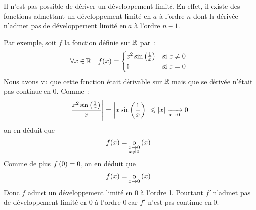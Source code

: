 \documentclass{magnoliaold}
\begin{document}
\begin{remarqueUnique}
\remarque Il n'est pas possible de dériver un développement limité.
  En effet, il existe des fonctions admettant un développement limité en $a$
  à l'ordre $n$ dont la dérivée n'admet pas de développement limité en $a$
  à l'ordre $n-1$.
  \begin{sol}
  Par exemple, soit $f$ la fonction définie sur $\mathbb{R}$ par~:
  \[\forall x\in\mathbb{R} \quad f(x)=
    \begin{cases}
    x^2\sin\left(\frac{1}{x}\right) & \text{si $x\neq 0$}\\
    0 & \text{si $x=0$}
    \end{cases}\]
  Nous avons vu que cette fonction était dérivable sur $\mathbb{R}$ mais que se dérivée
  n'était pas continue en 0. Comme~:
  \[\left|\frac{x^2\sin\left(\frac{1}{x}\right)}{x}\right|
    =\left|x\sin\left(\frac{1}{x}\right)\right|\leqslant\left|x\right|\xrightarrow[x\rightarrow 0]{}0\]
  on en déduit que
  \[f(x)=\underset{\substack{x \rightarrow 0\\x \neq 0}}{\text{o}} \left(x\right)\]
  Comme de plus $f\left(0\right)=0$, on en déduit que
  \[f(x)=\underset{x \rightarrow 0}{\text{o}}\left(x\right)\]
  Donc $f$ admet un développement limité en 0 à l'ordre 1. Pourtant $f'$ n'admet
  pas de développement limité en 0 à l'ordre 0 car $f'$ n'est pas continue en
  0.    
  \end{sol}
\end{remarqueUnique}
\end{document}
